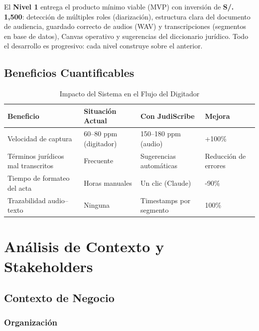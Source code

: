 \documentclass[12pt,a4paper]{report}
\begin{document}
El \textbf{Nivel 1} entrega el producto mínimo viable (MVP) con inversión de \textbf{S/. 1,500}: detección de múltiples roles (diarización), estructura clara del documento de audiencia, guardado correcto de audios (WAV) y transcripciones (segmentos en base de datos), Canvas operativo y sugerencias del diccionario jurídico. Todo el desarrollo es progresivo: cada nivel construye sobre el anterior.

\section{Beneficios Cuantificables}

\begin{table}[H]
\centering
\begin{tabular}{|p{4.2cm}|p{2.8cm}|p{2.8cm}|p{2.5cm}|}
\hline
\rowcolor{primaryblue!20}
\textbf{Beneficio} & \textbf{Situación Actual} & \textbf{Con JudiScribe} & \textbf{Mejora} \\
\hline
Velocidad de captura & 60--80 ppm (digitador) & 150--180 ppm (audio) & +100\% \\
\hline
Términos jurídicos mal transcritos & Frecuente & Sugerencias automáticas & Reducción de errores \\
\hline
Tiempo de formateo del acta & Horas manuales & Un clic (Claude) & -90\% \\
\hline
Trazabilidad audio--texto & Ninguna & Timestamps por segmento & 100\% \\
\hline
\end{tabular}
\caption{Impacto del Sistema en el Flujo del Digitador}
\end{table}

\chapter{Análisis de Contexto y Stakeholders}

\section{Contexto de Negocio}

\subsection{Organización}
\end{document}
